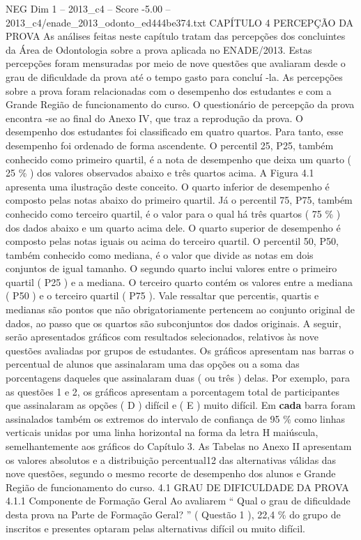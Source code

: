 \begin{textsample}{NEG Dim 1 – 2013\_c4 – Score -5.00 – 2013\_c4/enade\_2013\_odonto\_ed444be374.txt}  \label{ex:f1_neg_057}
CAPÍTULO 4 PERCEPÇÃO DA PROVA As análises feitas neste capítulo tratam das percepções dos concluintes da Área de Odontologia sobre a prova aplicada no ENADE/2013.
Estas percepções foram mensuradas por meio de nove questões que avaliaram desde o grau de dificuldade da prova até o tempo gasto para concluí -la.
As percepções sobre a prova foram relacionadas com o desempenho dos estudantes e com a Grande Região de funcionamento do curso.
O questionário de percepção da prova encontra -se ao final do Anexo IV, que traz a reprodução da prova.
O desempenho dos estudantes foi classificado em quatro quartos.
Para tanto, esse desempenho foi ordenado de forma ascendente.
O percentil 25, P25, também conhecido como primeiro quartil, é a nota de desempenho que deixa um quarto ( 25 \% ) dos valores observados abaixo e três quartos acima.
A Figura 4.1 apresenta uma ilustração deste conceito.
O quarto inferior de desempenho é composto pelas notas abaixo do primeiro quartil.
Já o percentil 75, P75, também conhecido como terceiro quartil, é o valor para o qual há três quartos ( 75 \% ) dos dados abaixo e um quarto acima dele.
O quarto superior de desempenho é composto pelas notas iguais ou acima do terceiro quartil.
O percentil 50, P50, também conhecido como mediana, é o valor que divide as notas em dois conjuntos de igual tamanho.
O segundo quarto inclui valores entre o primeiro quartil ( P25 ) e a mediana.
O terceiro quarto contém os valores entre a mediana ( P50 ) e o terceiro quartil ( P75 ).
Vale ressaltar que percentis, quartis e medianas são pontos que não obrigatoriamente pertencem ao conjunto original de dados, ao passo que os quartos são subconjuntos dos dados originais.
A seguir, serão apresentados gráficos com resultados selecionados, relativos às nove questões avaliadas por grupos de estudantes.
Os gráficos apresentam nas barras o percentual de alunos que assinalaram uma das opções ou a soma das porcentagens daqueles que assinalaram duas ( ou três ) delas.
Por exemplo, para as questões 1 e 2, os gráficos apresentam a porcentagem total de participantes que assinalaram as opções ( D ) difícil e ( E ) muito difícil.
Em \textbf{cada} barra foram assinalados também os extremos do intervalo de confiança de 95 \% como linhas verticais unidas por uma linha horizontal na forma da letra H maiúscula, semelhantemente aos gráficos do Capítulo 3.
As Tabelas no Anexo II apresentam os valores absolutos e a distribuição percentual12 das alternativas válidas das nove questões, segundo o mesmo recorte de desempenho dos alunos e Grande Região de funcionamento do curso. 4.1 GRAU DE DIFICULDADE DA PROVA 4.1.1 Componente de Formação Geral Ao avaliarem “ Qual o grau de dificuldade desta prova na Parte de Formação Geral? ” ( Questão 1 ), 22,4 \% do grupo de inscritos e presentes optaram pelas alternativas difícil ou muito difícil.

\end{textsample}
